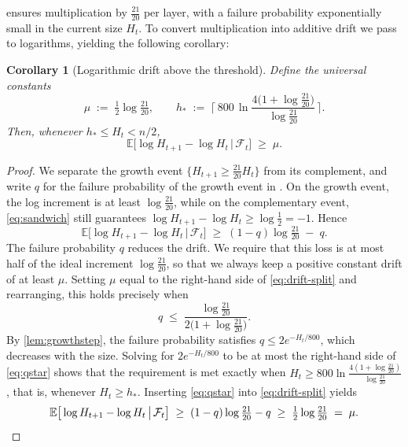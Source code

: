 \documentclass[
    aps,
    superscriptaddress,
    onecolumn,
    10pt,
    prx,
    nofootinbib
]{revtex4-2}
\newtheorem{corollary}{Corollary}
\theoremstyle{namedstatement}
\theoremstyle{plain}
\begin{document}
 ensures multiplication by $\tfrac{21}{20}$ per layer, with a
failure probability exponentially small in the current size $H_t$. To convert
multiplication into additive drift we pass to logarithms, yielding the following corollary:
\begin{corollary}[Logarithmic drift above the threshold]\label{cor:drift}
Define the universal constants
\begin{equation}\label{eq:constants}
  \mu \;:=\; \tfrac12\log\tfrac{21}{20},
  \qquad
  h_\ast \;:=\; \Bigg\lceil\,800\,\ln\frac{4\big(1+\log\frac{21}{20}\big)}
  {\log\frac{21}{20}}\,\Bigg\rceil .
\end{equation}
Then, whenever $h_\ast\le H_t<n/2$,
\[
  \mathbb E\big[\log H_{t+1}-\log H_t\,\big|\,\mathcal F_t\big]\;\ge\;\mu .
\]
\end{corollary}

\begin{proof}
We separate the growth event $\{H_{t+1}\ge\tfrac{21}{20}H_t\}$ from its complement,
and write $q$ for the failure probability of the growth event in
. On the growth event, the log increment is at least
$\log\tfrac{21}{20}$, while on the complementary event, \cref{eq:sandwich}
still guarantees $\log H_{t+1}-\log H_t\ge\log\tfrac12=-1$. Hence
\begin{equation}\label{eq:drift-split}
  \mathbb E\big[\log H_{t+1}-\log H_t\,\big|\,\mathcal F_t\big]
  \;\ge\;(1-q)\log\tfrac{21}{20}\;-\;q .
\end{equation}
The failure probability $q$ reduces the drift. We require that this loss is at most
half of the ideal increment $\log\tfrac{21}{20}$, so that we always keep a positive
constant drift of at least $\mu$. Setting $\mu$ equal to the right-hand side of
\cref{eq:drift-split} and rearranging, this holds precisely when
\begin{equation}\label{eq:qstar}
  q\;\le\;\frac{\log\frac{21}{20}}{2\big(1+\log\frac{21}{20}\big)}.
\end{equation}
By \cref{lem:growthstep}, the failure probability satisfies $q\leq 2e^{-H_t/800}$, which decreases with the size. Solving for
$2e^{-H_t/800}$ to be at most the right-hand side of \cref{eq:qstar} shows that the
requirement is met exactly when $H_t\ge 800\ln\frac{4(1+\log\frac{21}{20})}{\log\frac{21}{20}}$,
that is, whenever $H_t\ge h_\ast$. Inserting \cref{eq:qstar} into
\cref{eq:drift-split} yields
\begin{equation}
  \mathbb E\big[\log H_{t+1}-\log H_t\,\big|\,\mathcal F_t\big]
  \;\ge\;(1-q)\log\tfrac{21}{20}-q\;\ge\;\tfrac12\log\tfrac{21}{20}\;=\;\mu. \qedhere
\end{equation}
\end{proof}
\end{document}
